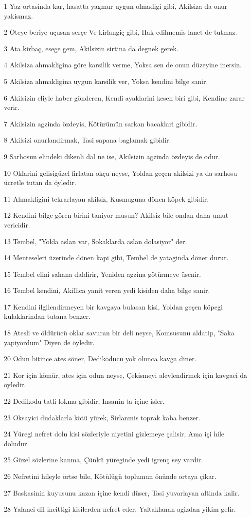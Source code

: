 \par 1 Yaz ortasinda kar, hasatta yagmur uygun olmadigi gibi, Akilsiza da onur yakismaz.
\par 2 Öteye beriye uçusan serçe Ve kirlangiç gibi, Hak edilmemis lanet de tutmaz.
\par 3 Ata kirbaç, esege gem, Akilsizin sirtina da degnek gerek.
\par 4 Akilsiza ahmakligina göre karsilik verme, Yoksa sen de onun düzeyine inersin.
\par 5 Akilsiza ahmakligina uygun karsilik ver, Yoksa kendini bilge sanir.
\par 6 Akilsizin eliyle haber gönderen, Kendi ayaklarini kesen biri gibi, Kendine zarar verir.
\par 7 Akilsizin agzinda özdeyis, Kötürümün sarkan bacaklari gibidir.
\par 8 Akilsizi onurlandirmak, Tasi sapana baglamak gibidir.
\par 9 Sarhosun elindeki dikenli dal ne ise, Akilsizin agzinda özdeyis de odur.
\par 10 Oklarini gelisigüzel firlatan okçu neyse, Yoldan geçen akilsizi ya da sarhosu ücretle tutan da öyledir.
\par 11 Ahmakligini tekrarlayan akilsiz, Kusmuguna dönen köpek gibidir.
\par 12 Kendini bilge gören birini taniyor musun? Akilsiz bile ondan daha umut vericidir.
\par 13 Tembel, "Yolda aslan var, Sokaklarda aslan dolasiyor" der.
\par 14 Menteseleri üzerinde dönen kapi gibi, Tembel de yataginda döner durur.
\par 15 Tembel elini sahana daldirir, Yeniden agzina götürmeye üsenir.
\par 16 Tembel kendini, Akillica yanit veren yedi kisiden daha bilge sanir.
\par 17 Kendini ilgilendirmeyen bir kavgaya bulasan kisi, Yoldan geçen köpegi kulaklarindan tutana benzer.
\par 18 Atesli ve öldürücü oklar savuran bir deli neyse, Komsusunu aldatip, "Saka yapiyordum" Diyen de öyledir.
\par 20 Odun bitince ates söner, Dedikoducu yok olunca kavga diner.
\par 21 Kor için kömür, ates için odun neyse, Çekismeyi alevlendirmek için kavgaci da öyledir.
\par 22 Dedikodu tatli lokma gibidir, Insanin ta içine isler.
\par 23 Oksayici dudaklarla kötü yürek, Sirlanmis toprak kaba benzer.
\par 24 Yüregi nefret dolu kisi sözleriyle niyetini gizlemeye çalisir, Ama içi hile doludur.
\par 25 Güzel sözlerine kanma, Çünkü yüreginde yedi igrenç sey vardir.
\par 26 Nefretini hileyle örtse bile, Kötülügü toplumun önünde ortaya çikar.
\par 27 Baskasinin kuyusunu kazan içine kendi düser, Tasi yuvarlayan altinda kalir.
\par 28 Yalanci dil incittigi kisilerden nefret eder, Yaltaklanan agizdan yikim gelir.

